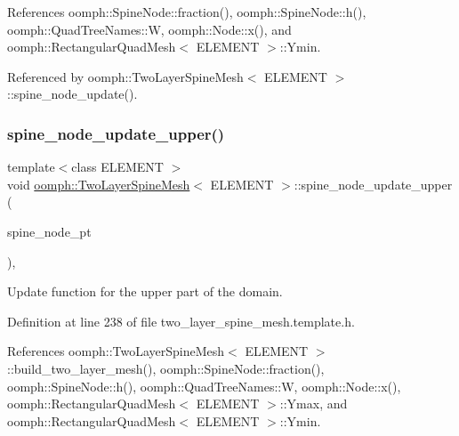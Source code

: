 References oomph\+::\+Spine\+Node\+::fraction(), oomph\+::\+Spine\+Node\+::h(), oomph\+::\+Quad\+Tree\+Names\+::W, oomph\+::\+Node\+::x(), and oomph\+::\+Rectangular\+Quad\+Mesh$<$ E\+L\+E\+M\+E\+N\+T $>$\+::\+Ymin.



Referenced by oomph\+::\+Two\+Layer\+Spine\+Mesh$<$ E\+L\+E\+M\+E\+N\+T $>$\+::spine\+\_\+node\+\_\+update().

\mbox{\label{classoomph_1_1TwoLayerSpineMesh_adc173b7505ec801a4aa688f97ffe55e0}} 
\subsubsection{\texorpdfstring{spine\+\_\+node\+\_\+update\+\_\+upper()}{spine\_node\_update\_upper()}}
{\footnotesize\ttfamily template$<$class E\+L\+E\+M\+E\+NT $>$ \\
void \hyperlink{classoomph_1_1TwoLayerSpineMesh}{oomph\+::\+Two\+Layer\+Spine\+Mesh}$<$ E\+L\+E\+M\+E\+NT $>$\+::spine\+\_\+node\+\_\+update\+\_\+upper (\begin{DoxyParamCaption}\item[{\hyperlink{classoomph_1_1SpineNode}{Spine\+Node} $\ast$}]{spine\+\_\+node\+\_\+pt }\end{DoxyParamCaption})\hspace{0.3cm}{\ttfamily [inline]}, {\ttfamily [protected]}}



Update function for the upper part of the domain. 



Definition at line 238 of file two\+\_\+layer\+\_\+spine\+\_\+mesh.\+template.\+h.



References oomph\+::\+Two\+Layer\+Spine\+Mesh$<$ E\+L\+E\+M\+E\+N\+T $>$\+::build\+\_\+two\+\_\+layer\+\_\+mesh(), oomph\+::\+Spine\+Node\+::fraction(), oomph\+::\+Spine\+Node\+::h(), oomph\+::\+Quad\+Tree\+Names\+::W, oomph\+::\+Node\+::x(), oomph\+::\+Rectangular\+Quad\+Mesh$<$ E\+L\+E\+M\+E\+N\+T $>$\+::\+Ymax, and oomph\+::\+Rectangular\+Quad\+Mesh$<$ E\+L\+E\+M\+E\+N\+T $>$\+::\+Ymin.



